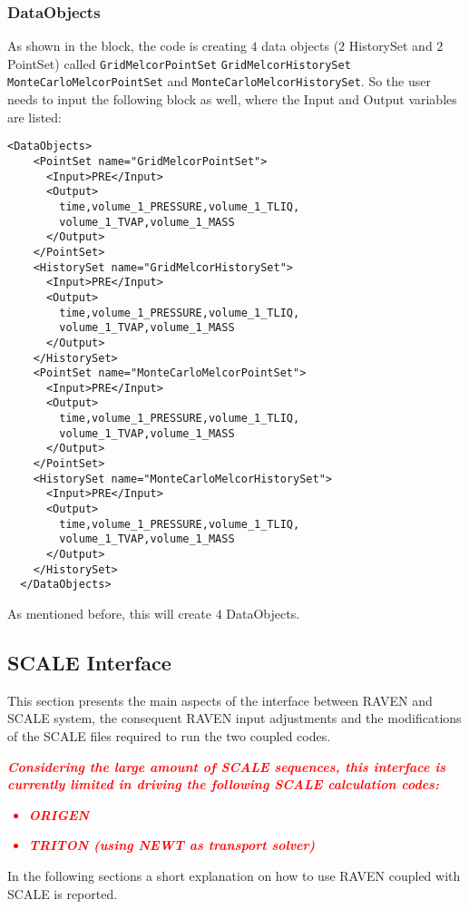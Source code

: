 \subsubsection{DataObjects}
As shown in the  block, the code is creating $4$ data objects ($2$ HistorySet and $2$ PointSet)
called \texttt{GridMelcorPointSet} \texttt{GridMelcorHistorySet} \texttt{MonteCarloMelcorPointSet} and
 \texttt{MonteCarloMelcorHistorySet}.
%
So the user needs to input the following block as well, where the Input and Output variables are listed:
\begin{lstlisting}[style=XML]
  <DataObjects>
    <PointSet name="GridMelcorPointSet">
      <Input>PRE</Input>
      <Output>
        time,volume_1_PRESSURE,volume_1_TLIQ,
        volume_1_TVAP,volume_1_MASS
      </Output>
    </PointSet>
    <HistorySet name="GridMelcorHistorySet">
      <Input>PRE</Input>
      <Output>
        time,volume_1_PRESSURE,volume_1_TLIQ,
        volume_1_TVAP,volume_1_MASS
      </Output>
    </HistorySet>
    <PointSet name="MonteCarloMelcorPointSet">
      <Input>PRE</Input>
      <Output>
        time,volume_1_PRESSURE,volume_1_TLIQ,
        volume_1_TVAP,volume_1_MASS
      </Output>
    </PointSet>
    <HistorySet name="MonteCarloMelcorHistorySet">
      <Input>PRE</Input>
      <Output>
        time,volume_1_PRESSURE,volume_1_TLIQ,
        volume_1_TVAP,volume_1_MASS
      </Output>
    </HistorySet>
  </DataObjects>
\end{lstlisting}
As mentioned before, this will create $4$ DataObjects.
%
\subsection{SCALE Interface}
This section presents the main aspects of the interface between RAVEN and SCALE system,
the consequent RAVEN input adjustments and the modifications of the SCALE
files required to run the two coupled codes.
\\ \textcolor{red}{
\textbf{\textit{\nb Considering the large amount of SCALE sequences, this interface is
currently limited in driving the following SCALE calculation codes:}}
\begin{itemize}
  \item \textbf{\textit{ORIGEN}}
  \item \textbf{\textit{TRITON (using NEWT as transport solver)}}
\end{itemize}
}

In the following sections a short explanation on how to use RAVEN coupled with SCALE is reported.

